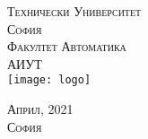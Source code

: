 \begin{titlepage}


	\vspace{0.5cm}
	\textsc{\LARGE Технически Университет\\
        София\\[0.3cm]
        	\vspace{0.5cm}
		\large Факултет Автоматика\\
        АИУТ}\\[0.5cm]
	\texttt{[image: logo]}




        \textsc{Април, 2021\\
        София}






\end{titlepage}
